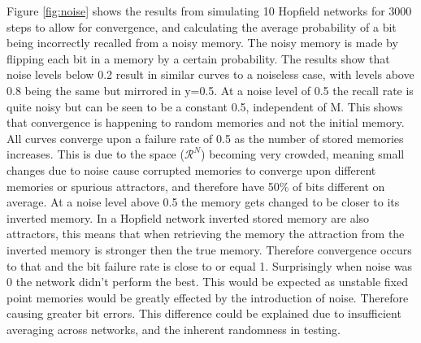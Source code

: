\documentclass[twoside,twocolumn]{article}
\begin{document}
Figure \ref{fig:noise} shows the results from simulating 10 Hopfield networks for 3000 steps to allow for convergence, and calculating the average probability of a bit being incorrectly recalled from a noisy memory. The noisy memory is made by flipping each bit in a memory by a certain probability. 
\newline
The results show that noise levels below 0.2 result in similar curves to a noiseless case, with levels above 0.8 being the same but mirrored in y=0.5. At a noise level of 0.5 the recall rate is quite noisy but can be seen to be a constant 0.5, independent of M. This shows that convergence is happening to random memories and not the initial memory. 
\newline
All curves converge upon a failure rate of 0.5 as the number of stored memories increases. This is due to the space ($\mathcal{R}^N$) becoming very crowded, meaning small changes due to noise cause corrupted memories to converge upon different memories or spurious attractors, and therefore have 50\% of bits different on average.
\newline
At a noise level above 0.5 the memory gets changed to be closer to its inverted memory. In a Hopfield network inverted stored memory are also attractors, this means that when retrieving the memory the attraction from the inverted memory is stronger then the true memory. Therefore convergence occurs to that and the bit failure rate is close to or equal 1.
\newline
Surprisingly when noise was 0 the network didn't perform the best. This would be expected as unstable fixed point memories would be greatly effected by the introduction of noise. Therefore causing greater bit errors. This difference could be explained due to insufficient averaging across networks, and the inherent randomness in testing.
 \newpage
\end{document}
